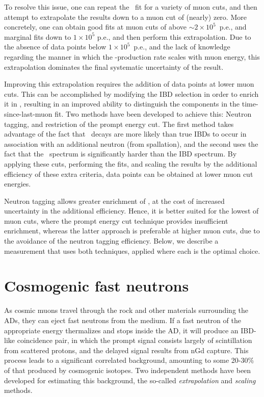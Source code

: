 \documentclass[../thesis.tex]{subfiles}
\begin{document}
To resolve this issue, one can repeat the \linine\ fit for a variety of muon cuts, and then attempt to extrapolate the results down to a muon cut of (nearly) zero. More concretely, one can obtain good fits at muon cuts of above $\sim 2\times10^5$~p.e., and marginal fits down to $1\times10^5$ p.e., and then perform this extrapolation. Due to the absence of data points below $1\times10^5$~p.e., and the lack of knowledge regarding the manner in which the \linine-production rate scales with muon energy, this extrapolation dominates the final systematic uncertainty of the result.

Improving this extrapolation requires the addition of data points at lower muon cuts. This can be accomplished by modifying the IBD selection in order to enrich it in \linine, resulting in an improved ability to distinguish the components in the time-since-last-muon fit. Two methods have been developed to achieve this: Neutron tagging, and restriction of the prompt energy cut. The first method takes advantage of the fact that \linine\ decays are more likely than true IBDs to occur in association with an additional neutron (from spallation), and the second uses the fact that the \linine\ spectrum is significantly harder than the IBD spectrum. By applying these cuts, performing the fits, and scaling the results by the additional efficiency of these extra criteria, data points can be obtained at lower muon cut energies.

Neutron tagging allows greater enrichment of \linine, at the cost of increased uncertainty in the additional efficiency. Hence, it is better suited for the lowest of muon cuts, where the prompt energy cut technique provides insufficient enrichment, whereas the latter approach is preferable at higher muon cuts, due to the avoidance of the neutron tagging efficiency. Below, we describe a measurement that uses both techniques, applied where each is the optimal choice.

\section{Cosmogenic fast neutrons}

As cosmic muons travel through the rock and other materials surrounding the ADs, they can eject fast neutrons from the medium. If a fast neutron of the appropriate energy thermalizes and stops inside the AD, it will produce an IBD-like coincidence pair, in which the prompt signal consists largely of scintillation from scattered protons, and the delayed signal results from nGd capture. This process leads to a significant correlated background, amounting to some 20-30\% of that produced by cosmogenic isotopes. Two independent methods have been developed for estimating this background, the so-called \emph{extrapolation} and \emph{scaling} methods.
\end{document}
